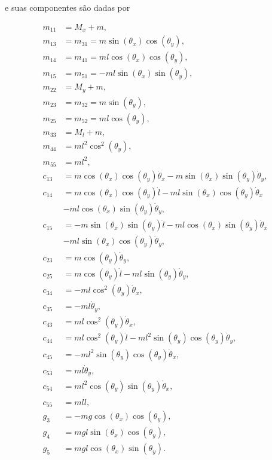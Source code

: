 \documentclass{ppgeesa}
\begin{document}
\noindent e suas componentes são dadas por

{\allowdisplaybreaks
\begin{align*}
m_{11} &= M_x + m, \\
m_{13} &= m_{31} = m \sin(\theta_x) \cos(\theta_y), \\
m_{14} &= m_{41} = ml \cos(\theta_x) \cos(\theta_y), \\
m_{15} &= m_{51} = -ml \sin(\theta_x) \sin(\theta_y), \\
m_{22} &= M_y + m, \\
m_{23} &= m_{32} = m \sin(\theta_y), \\
m_{25} &= m_{52} = ml \cos(\theta_y), \\
m_{33} &= M_l + m, \\
m_{44} &= ml^2 \cos^2(\theta_y), \\
m_{55} &= ml^2, \\
c_{13} &= m \cos(\theta_x) \cos(\theta_y) \dot{\theta}_x - m \sin(\theta_x) \sin(\theta_y) \dot{\theta}_y, \\
c_{14} &= m \cos(\theta_x) \cos(\theta_y) \dot{l} - ml \sin(\theta_x) \cos(\theta_y) \dot{\theta}_x \\
    &- ml \cos(\theta_x) \sin(\theta_y) \dot{\theta}_y, \\
c_{15} &= -m \sin(\theta_x) \sin(\theta_y) \dot{l} - ml \cos(\theta_x) \sin(\theta_y) \dot{\theta}_x \\
    &- ml \sin(\theta_x) \cos(\theta_y) \dot{\theta}_y, \\
c_{23} &= m \cos(\theta_y) \dot{\theta}_y, \\
c_{25} &= m \cos(\theta_y) \dot{l} - ml \sin(\theta_y) \dot{\theta}_y, \\
c_{34} &= -ml \cos^2(\theta_y) \dot{\theta}_x, \\
c_{35} &= -ml \dot{\theta}_y, \\
c_{43} &= ml \cos^2(\theta_y) \dot{\theta}_x, \\
c_{44} &= ml \cos^2(\theta_y) \dot{l} - ml^2 \sin(\theta_y) \cos(\theta_y) \dot{\theta}_y, \\
c_{45} &= -ml^2 \sin(\theta_y) \cos(\theta_y) \dot{\theta}_x, \\
c_{53} &= ml \dot{\theta}_y, \\
c_{54} &= ml^2 \cos(\theta_y) \sin(\theta_y) \dot{\theta}_x, \\
c_{55} &= ml \dot{l}, \\
g_3 &= -mg \cos(\theta_x) \cos(\theta_y), \\
g_4 &= mgl \sin(\theta_x) \cos(\theta_y), \\
g_5 &= mgl \cos(\theta_x) \sin(\theta_y).
\end{align*}
}
\end{document}
